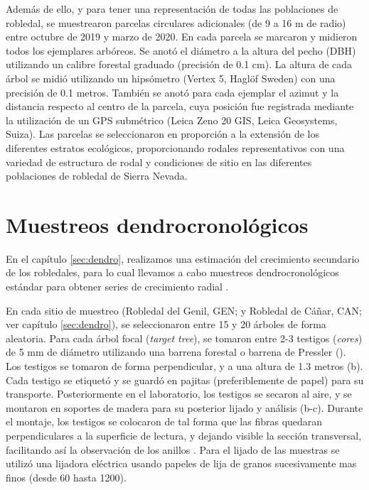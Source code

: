 Además de ello, y para tener una representación de todas las poblaciones de robledal, se muestrearon parcelas circulares adicionales (de 9 a 16 m de radio) entre octubre de 2019 y marzo de 2020. En cada parcela se marcaron y midieron todos los ejemplares arbóreos. Se anotó el diámetro a la altura del pecho (DBH) utilizando un calibre forestal graduado (precisión de 0.1 cm). La altura de cada árbol se midió utilizando un hipsómetro (Vertex 5, Haglöf Sweden) con una precisión de 0.1 metros. También se anotó para cada ejemplar el azimut y la distancia respecto al centro de la parcela, cuya posición fue registrada mediante la utilización de un GPS submétrico (Leica Zeno 20 GIS, Leica Geosystems, Suiza). Las parcelas se seleccionaron en proporción a la extensión de los diferentes estratos ecológicos, proporcionando rodales representativos con una variedad de estructura de rodal y condiciones de sitio en las diferentes poblaciones de robledal de Sierra Nevada. 

\section{Muestreos dendrocronológicos}
\label{sec:metodologia:dendro}

En el capítulo \ref{sec:dendro}, realizamos una estimación del crecimiento secundario de los robledales, para lo cual llevamos a cabo muestreos dendrocronológicos estándar para obtener series de crecimiento radial \autocite{Fritts1976TreeRings,CookKairukstis1990MethodsDendrochronology,Gutierrez2008DendrocronologiaMetodos,Natalinietal2017TecnicasHerramientas}.

En cada sitio de muestreo (Robledal del Genil, GEN; y Robledal de Cáñar, CAN; ver capítulo \ref{sec:dendro}), se seleccionaron entre 15 y 20 árboles de forma aleatoria. Para cada árbol focal (\emph{target tree}), se tomaron entre 2-3 testigos (\emph{cores}) de 5 mm de diámetro utilizando una barrena forestal o barrena de Pressler \autocite{GrissinoMayer2003ManualTutorial} (). Los testigos se tomaron de forma perpendicular, y a una altura de 1.3 metros (b). Cada testigo se etiquetó y se guardó en pajitas (preferiblemente de papel) para su transporte. Posteriormente en el laboratorio, los testigos se secaron al aire, y se montaron en soportes de madera para su posterior lijado y análisis (b-c). Durante el montaje, los testigos se colocaron de tal forma que las fibras quedaran perpendiculares a la superficie de lectura, y dejando visible la sección transversal, facilitando así la observación de los anillos \autocite{Fritts1976TreeRings,Natalinietal2017TecnicasHerramientas}. Para el lijado de las muestras se utilizó una lijadora eléctrica usando papeles de lija de granos sucesivamente mas finos (desde 60 hasta 1200).


